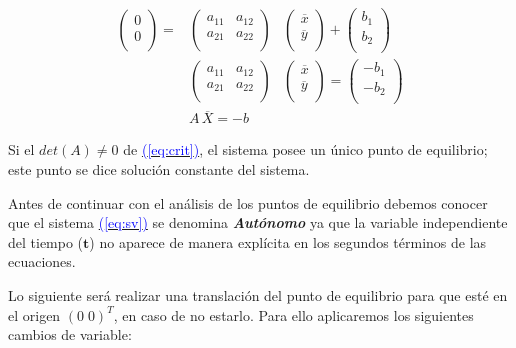 \documentclass[12pt,a4paper]{report} %
\newcommand{\eref}[1]{\hyperref[#1]{\textcolor{blue}{(\ref*{#1})}}}
\newcommand{\eref}[1]{\hyperref[#1]{\textcolor{blue}{\textit{(\ref*{#1})}}}}
\begin{document}
	\begin{eqnarray}
		\label{eq:crit}
			\begin{pmatrix}
				0\\
				0\\
			\end{pmatrix} =
			&\begin{pmatrix}
				a_{11} & a_{12}\\
				a_{21} & a_{22}\\
			\end{pmatrix}&
			\begin{pmatrix}
				\overline{x}\\
				\overline{y}\\
			\end{pmatrix} + 
			\begin{pmatrix}
				b_1\\
				b_2\\
			\end{pmatrix}\nonumber \\[4mm]
			&\begin{pmatrix}
			a_{11} & a_{12}\\
			a_{21} & a_{22}\\
			\end{pmatrix}&
			\begin{pmatrix}
			\overline{x}\\
			\overline{y}\\
			\end{pmatrix} = 
			\begin{pmatrix}
			-b_1\\
			-b_2\\
			\end{pmatrix} \nonumber \\[4mm]
			&A\,\overline{X}=-b
	\end{eqnarray}\smallskip
	
	\noindent Si el $det(A)\neq0$ de \eref{eq:crit}, el sistema posee un único punto de equilibrio; este punto se dice solución constante del sistema.
    
    \vspace{0.5cm}Antes de continuar con el análisis de los puntos de equilibrio debemos conocer que el sistema \eref{eq:sv} se denomina \textit{\textbf{Autónomo}} ya que la variable independiente del tiempo ($\bm{t}$) no aparece de manera explícita en los segundos términos de las ecuaciones.
    
    \vspace{0.5cm}\noindent Lo siguiente será realizar una translación del punto de equilibrio para que esté en el origen $(0\; 0)^T$, en caso de no estarlo. Para ello aplicaremos los siguientes cambios de variable:
    
\end{document}
